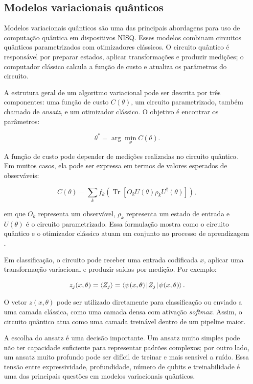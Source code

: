 \documentclass[
    12pt,
    openright,
    oneside,
    a4paper,
    english,
    brazil
]{abntex2}
\begin{document}
\subsection{Modelos variacionais quânticos}

Modelos variacionais quânticos são uma das principais abordagens para uso de computação quântica em dispositivos NISQ. Esses modelos combinam circuitos quânticos parametrizados com otimizadores clássicos. O circuito quântico é responsável por preparar estados, aplicar transformações e produzir medições; o computador clássico calcula a função de custo e atualiza os parâmetros do circuito.

A estrutura geral de um algoritmo variacional pode ser descrita por três componentes: uma função de custo \(C(\theta)\), um circuito parametrizado, também chamado de \textit{ansatz}, e um otimizador clássico. O objetivo é encontrar os parâmetros:

\[
\theta^* =
\arg\min_{\theta}
C(\theta).
\]

A função de custo pode depender de medições realizadas no circuito quântico. Em muitos casos, ela pode ser expressa em termos de valores esperados de observáveis:

\[
C(\theta)
=
\sum_k
f_k
\left(
\operatorname{Tr}
[
O_k U(\theta)\rho_k U^\dagger(\theta)
]
\right),
\]

em que \(O_k\) representa um observável, \(\rho_k\) representa um estado de entrada e \(U(\theta)\) é o circuito parametrizado. Essa formulação mostra como o circuito quântico e o otimizador clássico atuam em conjunto no processo de aprendizagem \cite{cerezo2021variational}.

Em classificação, o circuito pode receber uma entrada codificada \(x\), aplicar uma transformação variacional e produzir saídas por medição. Por exemplo:

\[
z_j(x,\theta)
=
\langle Z_j \rangle
=
\bra{\psi(x,\theta)}
Z_j
\ket{\psi(x,\theta)}.
\]

O vetor \(z(x,\theta)\) pode ser utilizado diretamente para classificação ou enviado a uma camada clássica, como uma camada densa com ativação \textit{softmax}. Assim, o circuito quântico atua como uma camada treinável dentro de um pipeline maior.

A escolha do ansatz é uma decisão importante. Um ansatz muito simples pode não ter capacidade suficiente para representar padrões complexos; por outro lado, um ansatz muito profundo pode ser difícil de treinar e mais sensível a ruído. Essa tensão entre expressividade, profundidade, número de qubits e treinabilidade é uma das principais questões em modelos variacionais quânticos.
\end{document}
